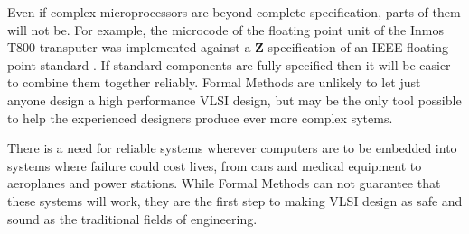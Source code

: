 Even if complex microprocessors are beyond complete specification, parts of them will not be.
For example, the microcode of the floating point unit of the Inmos T800 transputer was implemented against a {\bf Z} specification of an IEEE floating point standard
\cite{inmos:transputer}.
If standard components are fully specified then it will be easier to combine them together reliably. Formal Methods are unlikely to let just anyone design a high performance VLSI design, but may be the only tool possible to help the experienced designers produce ever more complex sytems.

There is a need for reliable systems wherever computers are to be  embedded into  systems where failure could cost lives, from cars and medical equipment  to aeroplanes and power stations. While Formal Methods can not guarantee that these systems will work, they are the first step to making VLSI design as safe and sound as the traditional fields of engineering.



